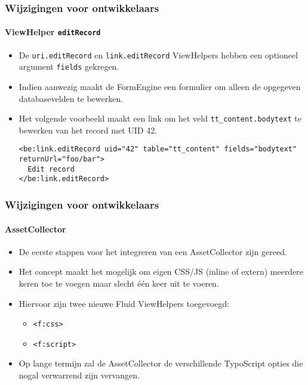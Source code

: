 
\begin{frame}[fragile]
	\frametitle{Wijzigingen voor ontwikkelaars}
	\framesubtitle{ViewHelper \texttt{editRecord}}

	\lstset{basicstyle=\tiny\ttfamily}

	\begin{itemize}
		\item De \texttt{uri.editRecord} en \texttt{link.editRecord} ViewHelpers hebben een
			optioneel argument \texttt{fields} gekregen.
		\item Indien aanwezig maakt de FormEngine een formulier om alleen de opgegeven databasevelden te bewerken.
		\item Het volgende voorbeeld maakt een link om het veld \texttt{tt\_content.bodytext}
			te bewerken van het record met UID 42.

\begin{lstlisting}
<be:link.editRecord uid="42" table="tt_content" fields="bodytext" returnUrl="foo/bar">
  Edit record
</be:link.editRecord>
\end{lstlisting}

	\end{itemize}

\end{frame}


\begin{frame}[fragile]
	\frametitle{Wijzigingen voor ontwikkelaars}
	\framesubtitle{AssetCollector}

	\begin{itemize}
		\item De eerste stappen voor het integreren van een AssetCollector zijn gereed.
		\item Het concept maakt het mogelijk om eigen CSS/JS (inline of extern) meerdere
			keren toe te voegen maar slecht één keer uit te voeren.
		\item Hiervoor zijn twee nieuwe Fluid ViewHelpers toegevoegd:
			\begin{itemize}
				\item \texttt{<f:css>}
				\item \texttt{<f:script>}
			\end{itemize}
		\item Op lange termijn zal de AssetCollector de verschillende TypoScript opties
			die nogal verwarrend zijn vervangen.
	\end{itemize}

\end{frame}

